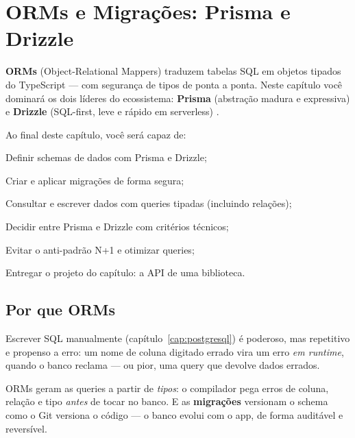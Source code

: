 \chapter{ORMs e Migrações: Prisma e Drizzle}
\label{cap:orms}

\begin{caixaconceito}
\textbf{ORMs} (Object-Relational Mappers) traduzem tabelas SQL em objetos
tipados do TypeScript — com segurança de tipos de ponta a ponta. Neste
capítulo você dominará os dois líderes do ecossistema: \textbf{Prisma}
(abstração madura e expressiva) e \textbf{Drizzle} (SQL-first, leve e rápido
em serverless) \cite{prisma-docs,drizzle-docs}.
\end{caixaconceito}

Ao final deste capítulo, você será capaz de:
\begin{objetivos}
  \item Definir schemas de dados com Prisma e Drizzle;
  \item Criar e aplicar migrações de forma segura;
  \item Consultar e escrever dados com queries tipadas (incluindo relações);
  \item Decidir entre Prisma e Drizzle com critérios técnicos;
  \item Evitar o anti-padrão N+1 e otimizar queries;
  \item Entregar o projeto do capítulo: a API de uma biblioteca.
\end{objetivos}

\section{Por que ORMs}

Escrever SQL manualmente (capítulo~\ref{cap:postgresql}) é poderoso, mas
repetitivo e propenso a erro: um nome de coluna digitado errado vira um erro
\emph{em runtime}, quando o banco reclama — ou pior, uma query que devolve
dados errados.

ORMs geram as queries a partir de \emph{tipos}: o compilador pega erros de
coluna, relação e tipo \emph{antes} de tocar no banco. E as \textbf{migrações}
versionam o schema como o Git versiona o código — o banco evolui com o app, de
forma auditável e reversível.

